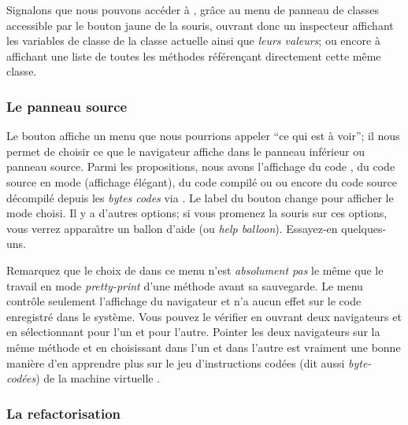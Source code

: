 \documentclass[a4paper,10pt,twoside]{book}
\begin{document}
Signalons que nous pouvons acc\'eder \`a ,
gr\^ace au menu de panneau de classes accessible par le bouton jaune
de la souris, 
ouvrant donc un inspecteur affichant les variables de classe 
de la classe actuelle ainsi que \emph{leurs valeurs};
ou encore \`a
 affichant une liste de toutes les m\'ethodes
r\'ef\'eren\c{c}ant directement cette m\^eme classe.

\subsubsection{Le panneau source}
\label{sec:sources}

Le bouton  affiche un menu que nous pourrions appeler
``ce qui est \`a voir''; il nous permet de choisir ce que le navigateur
affiche dans le panneau inf\'erieur ou panneau source.
Parmi les propositions, nous avons l'affichage du code , 
du code source en mode  (affichage \'el\'egant), 
du code compil\'e ou  ou encore du code source
d\'ecompil\'e depuis les \emph{bytes codes} via .
Le label du bouton change pour afficher le mode choisi. Il y a d'autres
options; si vous promenez la souris sur ces options, vous verrez
appara\^{\i}tre un ballon d'aide (ou \emph{help balloon}). Essayez-en
quelques-uns. 

Remarquez que le choix de  dans ce menu n'est \emph{absolument pas} le m\^eme que le travail en mode \emph{pretty-print} d'une m\'ethode
avant sa sauvegarde.
Le menu contr\^ole seulement l'affichage du navigateur et n'a aucun effet sur
le code enregistr\'e dans le syst\`eme.
Vous pouvez le v\'erifier en ouvrant deux navigateurs et en s\'electionnant
 pour l'un et  pour l'autre.
Pointer les deux navigateurs sur la m\^eme m\'ethode et en choisissant
 dans l'un et  dans l'autre est vraiment
une bonne mani\`ere d'en apprendre plus sur le jeu d'instructions cod\'ees
(dit aussi \emph{byte-cod\'ees}) de la machine virtuelle \pharo.

\subsubsection{La refactorisation}

\end{document}
